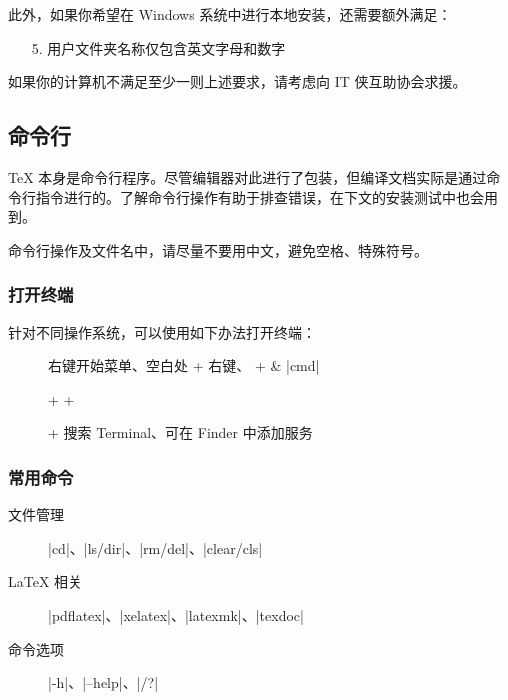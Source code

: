 此外，如果你希望在 Windows 系统中进行本地安装，还需要额外满足：

\begin{enumerate}
  \item[5.] 用户文件夹名称仅包含英文字母和数字
\end{enumerate}

如果你的计算机不满足至少一则上述要求，请考虑向 IT 侠互助协会求援。

\subsection{命令行}
\label{subsec:terminal}

\TeX{} 本身是命令行程序。尽管编辑器对此进行了包装，但编译文档实际是通过命令行指令进行的。了解命令行操作有助于排查错误，在下文的安装测试中也会用到。

命令行操作及文件名中，请尽量不要用中文，避免空格、特殊符号。

\subsubsection{打开终端}

针对不同操作系统，可以使用如下办法打开终端：

\begin{description}
  \item[\faWindows{}] 右键开始菜单、空白处  + 右键、 +  \& |cmd|
  \item[\faLinux{}]  +  + 
  \item[\faApple{}]  +  搜索 Terminal、可在 Finder 中添加服务
\end{description}

\subsubsection{常用命令}

\begin{description}
  \item[文件管理] |cd|、|ls/dir|、|rm/del|、|clear/cls|
  \item[\LaTeX{} 相关] |pdflatex|、|xelatex|、|latexmk|、|texdoc|
  \item[命令选项] |-h|、|--help|、|/?|
\end{description}

